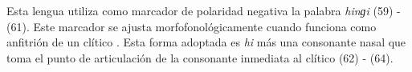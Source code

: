Esta lengua utiliza como marcador de polaridad negativa la palabra {\setmainfont{Charis SIL} \textit{hinɡi}} (59) - (61). Este marcador se ajusta morfofonológicamente cuando funciona como anfitrión de un clítico \textcolor{MidnightBlue}{\citep{Otomi}}. Esta forma adoptada es {\setmainfont{Charis SIL} \textit{hi}} más una consonante nasal que toma el punto de articulación de la consonante inmediata al clítico (62) - (64).